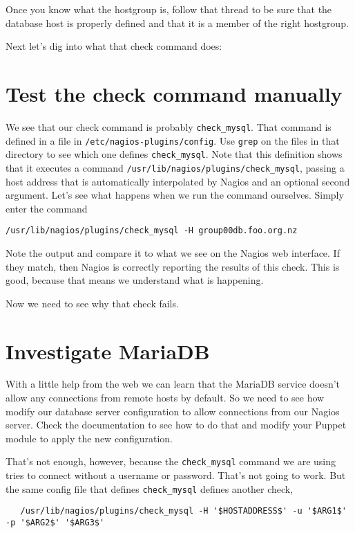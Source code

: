 \documentclass{article}         %
\begin{document}
Once you know what the hostgroup is, follow that thread to be sure that the database host is properly defined and that it is a member of the right hostgroup.

Next let's dig into what that check command does:

\section{Test the check command manually}
We see that our check command is probably \texttt{check\_mysql}. That command is defined in a file in \texttt{/etc/nagios-plugins/config}. Use \texttt{grep} on the files in that directory to see which one defines \texttt{check\_mysql}. Note that this definition shows that it executes a command \texttt{/usr/lib/nagios/plugins/check\_mysql}, passing a host address that is automatically interpolated by Nagios and an optional second argument. Let's see what happens when we run the command ourselves. Simply enter the command 

\texttt{/usr/lib/nagios/plugins/check\_mysql -H group00db.foo.org.nz}

Note the output and compare it to what we see on the Nagios web interface. If they match, then Nagios is correctly reporting the results of this check. This is good, because that means we understand what is happening.

Now we need to see why that check fails.

\section{Investigate MariaDB}
With a little help from the web we can learn that the MariaDB service doesn't allow any connections from remote hosts by default. So we need to see how modify our database server configuration to allow connections from our Nagios server. Check the documentation to see how to do that and modify your Puppet module to apply the new configuration.

That's not enough, however, because the \texttt{check\_mysql} command we are using tries to connect without a username or password. That's not going to work. But the same config file that defines \texttt{check\_mysql} defines another check, 

\begin{verbatim}
   /usr/lib/nagios/plugins/check_mysql -H '$HOSTADDRESS$' -u '$ARG1$' -p '$ARG2$' '$ARG3$'
\end{verbatim}
\end{document}
